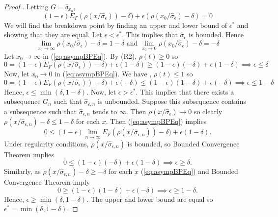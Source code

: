 \begin{proof}[Proof.]
Letting $G = \delta_{x_0}$,
\begin{equation}
\label{eq:asympBPEq}
    (1-\epsilon) E_F (\rho(x/\hat\sigma_\epsilon)) - \delta) + \epsilon(\rho(x_0/\hat\sigma_\epsilon) - \delta) = 0
\end{equation}
We will find the breakdown point by finding an upper and lower bound of $\epsilon^*$ and showing that they are equal. Let $\epsilon < \epsilon^*$. This implies that $\hat \sigma_\epsilon$ is bounded. Hence
\begin{equation}
    \lim_{x_0 \xrightarrow{} \infty} \rho(x_0/\hat\sigma_\epsilon) - \delta = 1 - \delta \text{ and } \lim_{x_0 \xrightarrow{} 0} \rho(x_0/\hat\sigma_\epsilon) - \delta = - \delta
\end{equation}
Let $x_0 \xrightarrow{} \infty$ in (\ref{eq:asympBPEq}). By (R2), $\rho(t) \geq 0$ so
\begin{equation}
\label{eq:asympBPEq}
    0 = (1-\epsilon) E_F (\rho(x/\hat\sigma_\epsilon)) - \delta) + \epsilon(1 - \delta) \geq (1-\epsilon) (-\delta) + \epsilon(1 - \delta) \implies \epsilon \leq \delta
\end{equation}
Now, let $x_0 \xrightarrow{} 0$ in (\ref{eq:asympBPEq}). We have , $\rho(t) \leq 1$ so
\begin{equation}
\label{eq:asympBPEq}
    0 = (1-\epsilon) E_F (\rho(x/\hat\sigma_\epsilon)) - \delta) + \epsilon(- \delta) \leq (1-\epsilon) (1 -\delta) + \epsilon( - \delta) \implies \epsilon \leq 1 - \delta
\end{equation}
Hence, $\epsilon \leq \min(\delta,1-\delta)$. Now, let $\epsilon > \epsilon^*$. This implies that there exists a subsequence $G_n$ such that $\hat \sigma_{\epsilon,n}$ is unbounded. Suppose this subsequence contains a subsequence such that $\hat \sigma_{\epsilon,n}$ tends to $\infty$. Then $\rho(x/\hat\sigma_\epsilon) \xrightarrow{} 0$ so clearly $\rho(x/\hat \sigma_{\epsilon,n}) -\delta \leq 1-\delta$ for each $x$. Then (\ref{eq:asympBPEq}) implies
\begin{equation}
\label{eq:asympBPEq}
    0 \leq (1-\epsilon) \lim_{n \xrightarrow{} \infty} E_F (\rho(x/\hat \sigma_{\epsilon,n})) - \delta) + \epsilon(1 - \delta).
\end{equation}
Under regularity conditions, $\rho(x/\hat \sigma_{\epsilon,n})$ is bounded, so Bounded Convergence Theorem implies
\begin{equation}
\label{eq:asympBPEq}
    0 \leq (1-\epsilon) ( - \delta) + \epsilon(1 - \delta) \implies \epsilon \geq \delta.
\end{equation}
Similarly, as $\rho(x/\hat \sigma_{\epsilon,n}) -\delta \geq -\delta$ for each $x$ (\ref{eq:asympBPEq})  and Bounded Convergence Theorem imply
\begin{equation}
\label{eq:asympBPEq}
    0 \geq (1-\epsilon) (1 - \delta) + \epsilon( - \delta) \implies \epsilon \geq 1 - \delta.
\end{equation}
Hence, $\epsilon \geq \min(\delta, 1 - \delta)$. The upper and lower bound are equal so $\epsilon^* = \min(\delta, 1 - \delta)$.
\end{proof}


